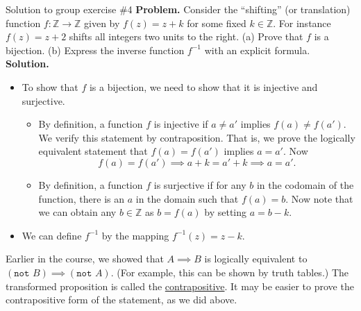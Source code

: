\documentclass[10pt]{beamer}
\begin{document}
\begin{frame}{Solution to group exercise \#4}
\footnotesize 
\textbf{Problem.} Consider the \enquote{shifting} (or translation) function $f: \mathbb{Z} \to \mathbb{Z}$ given by $f(z) = z+k$ for some fixed $k \in \mathbb{Z}$.  For instance $f(z) = z+2$ shifts all integers two units to the right.   (a) Prove that $f$ is a bijection. (b) Express the inverse function $f^{-1}$ with an explicit formula.  
\vfill
\textbf{Solution.}
\vspace{-0.2cm}
	\begin{itemize} \footnotesize 
		\item [a.] To show that $f$ is a bijection, we need to show that it is injective and surjective.
		\begin{itemize} \footnotesize 
		\item {}  By definition, a function $f$ is injective if $a \neq a'$ implies $f(a) \neq f(a')$.  We verify this statement by contraposition. That is, we prove the logically equivalent statement that $f(a) = f(a')$ implies $a =a'$. Now 
		\[f(a) = f(a') \implies a+k = a'+k \implies a=a'. \] 
		\item {}  By definition, a function $f$ is surjective if for any $b$ in the codomain of the function, there is an $a$ in the domain such that $f(a)=b$.  Now note that we can obtain any $b \in \mathbb{Z}$ as $b=f(a)$ by setting $a=b-k$.
		\end{itemize} 
		\item [b.] We can define $f^{-1}$ by the mapping $f^{-1}(z) = z-k.$
	\end{itemize} 
\vfill 
\begin{myredbox}[title=Remark: Proof by contraposition]
Earlier in the course, we showed that $A \implies B$ is logically equivalent to $(\texttt{not } B) \implies (\texttt{not } A)$.  (For example, this can be shown by truth tables.)  The transformed proposition is called the \underline{contrapositive}. It may be easier to prove the contrapositive form of the statement, as we did above.
\end{myredbox}

\end{frame}
\end{document}

